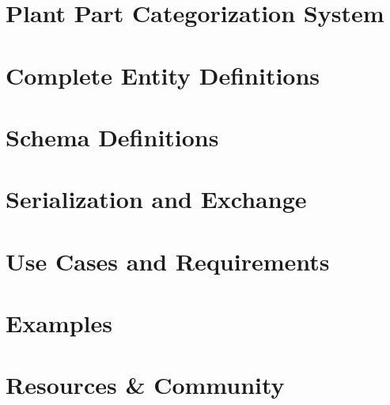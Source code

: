 \documentclass[12pt,a4paper]{article}
\begin{document}
\section{Plant Part Categorization System}
\label{sec:plant-parts}


\section{Complete Entity Definitions}
\label{sec:complete-entities}









\section{Schema Definitions}
\label{sec:schema-definitions}


\section{Serialization and Exchange}
\label{sec:serialization}


\section{Use Cases and Requirements}
\label{sec:use-cases}


\section{Examples}
\label{sec:examples}


\section{Resources \& Community}
\label{sec:resources-community}

\end{document}
